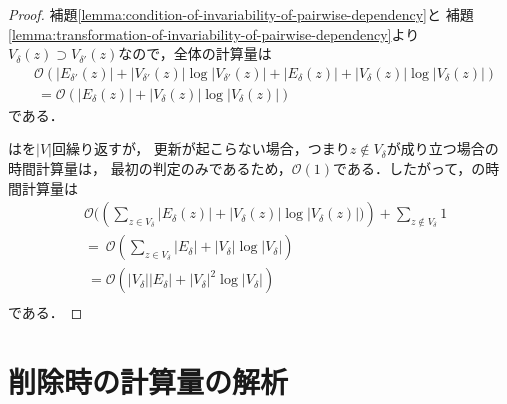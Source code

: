 \begin{proof}
  補題\ref{lemma:condition-of-invariability-of-pairwise-dependency}と
  補題\ref{lemma:transformation-of-invariability-of-pairwise-dependency}より
  $V_\delta(z)\supset V_{\delta'}(z)$なので，全体の計算量は
  \begin{equation*}
    \begin{aligned}
      &\mathcal{O}(
        \lvert E_{\delta'}(z)\rvert+\lvert V_{\delta'}(z)\rvert\log\lvert V_{\delta'}(z)\rvert
        +\lvert E_\delta(z)\rvert+\lvert V_\delta(z)\rvert\log\lvert V_\delta(z)\rvert
      ) \nonumber\\
      &\:=\mathcal{O}(\lvert E_\delta(z)\rvert+\lvert V_\delta(z)\rvert\log\lvert V_\delta(z)\rvert)
    \end{aligned}
  \end{equation*}
  である．

  はを$\lvert V\rvert$回繰り返すが，
  更新が起こらない場合，つまり$z\notin V_\delta$が成り立つ場合の時間計算量は，
  最初の判定のみであるため，$\mathcal{O}(1)$である．したがって，の時間計算量は
  \begin{equation*}
    \begin{aligned}
      &\mathcal{O}(\left(
        \sum_{z\in V_\delta}\lvert E_\delta(z)\rvert+\lvert V_\delta(z)\rvert\log\lvert V_\delta(z)\rvert)
        \right)+\sum_{z\notin V_\delta}1 \nonumber\\
      &=\:\mathcal{O}(\sum_{z\in V_\delta}\lvert E_\delta\rvert
      +\lvert V_\delta\rvert\log\lvert V_\delta\rvert)\nonumber\\
      &\:=\mathcal{O}(\lvert V_\delta\rvert\lvert E_\delta\rvert
      +\lvert V_\delta\rvert^2\log\lvert V_\delta\rvert) \nonumber\\
    \end{aligned}
  \end{equation*}
  である．
\end{proof}

\section{削除時の計算量の解析}
\label{subsect:computational-complexity-of-decremental-algorithm}

